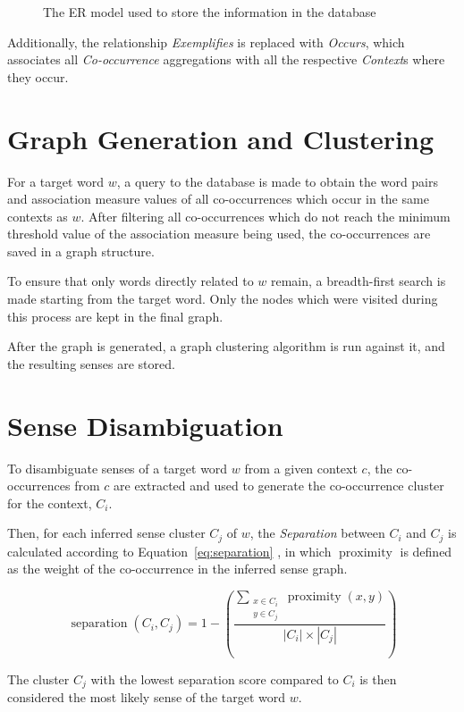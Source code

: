\begin{figure}[ht]
    \caption{The \acl*{ER} model used to store the information in the database}
    \label{fig:er-model}
    \centering
    
\end{figure}

Additionally, the relationship \emph{Exemplifies} is replaced with
\emph{Occurs}, which associates all \emph{Co-occurrence} aggregations with all
the respective \emph{Context}s where they occur.

\section{Graph Generation and Clustering}

For a target word $w$, a query to the database is made to obtain the word pairs 
and association measure values of all co-occurrences which occur in the same 
contexts as $w$. After filtering all co-occurrences which do not reach the 
minimum threshold value of the association measure being used, the 
co-occurrences are saved in a graph structure.

To ensure that only words directly related to $w$ remain, a breadth-first 
search is made starting from the target word. Only the nodes which were visited 
during this process are kept in the final graph.

After the graph is generated, a graph clustering algorithm is run against it,
and the resulting senses are stored.

\section{Sense Disambiguation}

To disambiguate senses of a target word $w$ from a given context
$c$, the co-occurrences from $c$ are extracted and used to generate
the co-occurrence cluster for the context, $C_i$.

Then, for each inferred sense cluster $C_j$ of $w$, the
\emph{Separation} between $C_i$ and $C_j$ is calculated according to
Equation~\ref{eq:separation} \citep{hope2013uos}, in which
$\operatorname{proximity}$ is defined as the weight of the co-occurrence in the
inferred sense graph.

\begin{equation}
 \operatorname{separation}(C_i,C_j) =
 1 - \left(
 \frac {\sum_{\substack{x \in C_i \\ y \in C_j}} \operatorname{proximity}(x,y)}
       {|C_i| \times |C_j|}
 \right)
\label{eq:separation}
\end{equation}

The cluster $C_j$ with the lowest separation score compared to $C_i$ is then
considered the most likely sense of the target word $w$.


